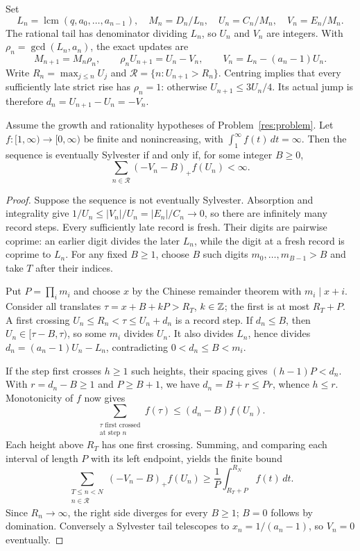 \documentclass[11pt]{article}
\begin{document}
Set
\[
 L_n=\operatorname{lcm}(q,a_0,\ldots,a_{n-1}),\quad
 M_n=D_n/L_n,\quad U_n=C_n/M_n,\quad V_n=E_n/M_n.
\]
The rational tail has denominator dividing $L_n$, so $U_n$ and $V_n$ are
integers. With $\rho_n=\gcd(L_n,a_n)$, the exact updates are
\[
 M_{n+1}=M_n\rho_n,\qquad
 \rho_nU_{n+1}=U_n-V_n,\qquad V_n=L_n-(a_n-1)U_n.
\]
Write $R_n=\max_{j\le n}U_j$ and
$\mathcal R=\{n:U_{n+1}>R_n\}$. Centring implies that every sufficiently
late strict rise has $\rho_n=1$: otherwise $U_{n+1}\le3U_n/4$.
Its actual jump is therefore $d_n=U_{n+1}-U_n=-V_n$.

\begin{theorem}\label{res:weightedrecord}
Assume the growth and rationality hypotheses of Problem~\ref{res:problem}.
Let $f:[1,\infty)\to[0,\infty)$ be finite and nonincreasing, with
$\int_1^\infty f(t)\,dt=\infty$. Then the sequence is eventually Sylvester
if and only if, for some integer $B\ge0$,
\[
 \sum_{n\in\mathcal R}(-V_n-B)_+f(U_n)<\infty.
\]
\end{theorem}

\begin{proof}
Suppose the sequence is not eventually Sylvester. Absorption and
integrality give $1/U_n\le |V_n|/U_n=|E_n|/C_n\to0$, so there are
infinitely many record steps. Every sufficiently late record is fresh.
Their digits are pairwise coprime: an earlier digit divides the later
$L_n$, while the digit at a fresh record is coprime to $L_n$.
For any fixed $B\ge1$, choose $B$ such digits
$m_0,\ldots,m_{B-1}>B$ and take $T$ after their indices.

Put $P=\prod_i m_i$ and choose $x$ by the Chinese remainder theorem with
$m_i\mid x+i$. Consider all translates $\tau=x+B+kP>R_T$, $k\in\mathbb{Z}$;
the first is at most $R_T+P$. A first crossing
$U_n\le R_n<\tau\le U_n+d_n$ is a record step. If $d_n\le B$, then
$U_n\in[\tau-B,\tau)$, so some $m_i$ divides $U_n$. It also divides
$L_n$, hence divides $d_n=(a_n-1)U_n-L_n$, contradicting
$0<d_n\le B<m_i$.

If the step first crosses $h\ge1$ such heights, their spacing gives
$(h-1)P<d_n$. With $r=d_n-B\ge1$ and $P\ge B+1$, we have
$d_n=B+r\le Pr$, whence $h\le r$. Monotonicity of $f$ now gives
\[
 \sum_{\substack{\tau\text{ first crossed}\\\text{at step }n}}f(\tau)
 \le(d_n-B)f(U_n).
\]
Each height above $R_T$ has one first crossing. Summing, and comparing each
interval of length $P$ with its left endpoint, yields the finite bound
\begin{equation}\label{eq:weightedcrossing}
 \sum_{\substack{T\le n<N\\n\in\mathcal R}}(-V_n-B)_+f(U_n)
 \ge\frac1P\int_{R_T+P}^{R_N} f(t)\,dt.
\end{equation}
Since $R_n\to\infty$, the right side diverges for every $B\ge1$;
$B=0$ follows by domination. Conversely a Sylvester tail telescopes to
$x_n=1/(a_n-1)$, so $V_n=0$ eventually.
\end{proof}
\end{document}
